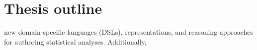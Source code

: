 
\section{Thesis outline}

new domain-specific languages (DSLs),
representations, and reasoning approaches for authoring statistical analyses. Additionally, 



\begin{comment}
\todo{Fill in this outline}

\section*{How to approach this dissertation} \todo{Decide if want to keep}

\section{Prior Publication and Authorship} \todo{fill in}
\end{comment}